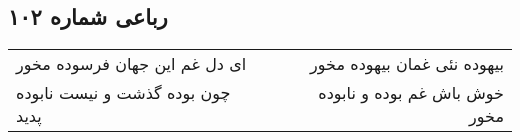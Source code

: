 \begin{center}
\section*{رباعی شماره ۱۰۲}
\label{sec:sh102}
\begin{longtable}{l p{0.5cm} r}
ای دل غم این جهان فرسوده مخور
&&
بیهوده نئی غمان بیهوده مخور
\\
چون بوده گذشت و نیست نابوده پدید
&&
خوش باش غم بوده و نابوده مخور
\\
\end{longtable}
\end{center}
